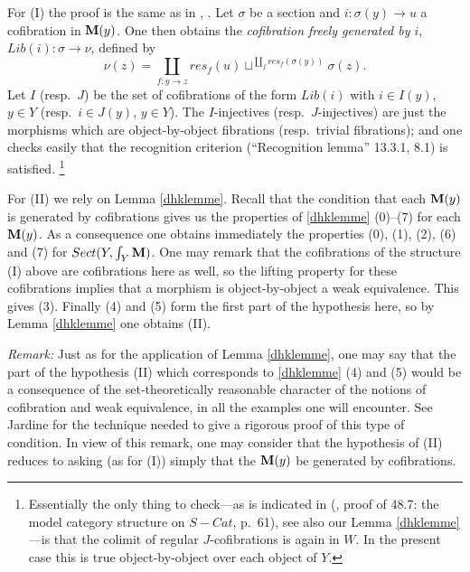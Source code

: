 For (I) the proof is the same as in \cite{Hirschhorn},
\cite{DHK}.
Let $\sigma$ be a section and $i: \sigma (y)\rightarrow u$ a cofibration in
${\bf M} (y)$. One then obtains the {\em cofibration freely generated by $i$},
$Lib(i): \sigma \rightarrow \nu$, defined by
$$
\nu (z) = \coprod _{f: y\rightarrow z} res_f(u) \sqcup ^{\coprod_{f}
res_f(\sigma (y))}\sigma (z).
$$
Let $I$ (resp.\ $J$) be the set of cofibrations
of the form $Lib(i)$ with $i\in I(y)$, $y\in Y$ (resp.\ $i\in J(y)$, $y\in
Y$).
The $I$-injectives (resp.\
$J$-injectives) are just the morphisms which are object-by-object fibrations
(resp.\ trivial fibrations); and one checks easily that the recognition
criterion (``Recognition lemma'' \cite{Hirschhorn} 13.3.1, \cite{DHK} 8.1)
is satisfied. \footnote{Essentially the
only thing to check---as is indicated in
(\cite{DHK}, proof of 48.7: the model category structure on
$S-Cat$, p.~61), see also our Lemma \ref{dhklemme}---is that the colimit of
regular $J$-cofibrations is again in $W$. In the present case
this is
true object-by-object over each object of $Y$.}


For (II) we rely on Lemma \ref{dhklemme}. Recall that the condition that each
${\bf M} (y)$
is generated by cofibrations gives us the properties of
\ref{dhklemme} (0)--(7) for each
${\bf M} (y)$. As a consequence one obtains immediately the properties (0), (1),
(2),
(6) and (7) for $Sect (Y,\int
_Y{\bf M} )$. One may remark that the cofibrations of the structure (I)
above are
cofibrations here as well, so the lifting property for these
cofibrations implies that a
morphism is object-by-object a weak equivalence. This gives (3).
Finally (4) and (5) form
the first part of the hypothesis here, so by Lemma \ref{dhklemme}
one obtains (II).

{\em Remark:} Just as for the application of Lemma \ref{dhklemme}, one
may say that the part
of the hypothesis (II) which corresponds to \ref{dhklemme} (4) and (5) would be
a consequence of the
set-theoretically reasonable character of the notions of cofibration and
weak equivalence,
in all the examples one will encounter. See Jardine \cite{Jardine} for the
technique needed to
give a rigorous proof of this type of condition. In view of this
remark, one may
consider that the hypothesis of (II) reduces to asking (as for
(I)) simply that the
${\bf M} (y)$ be generated by cofibrations.

